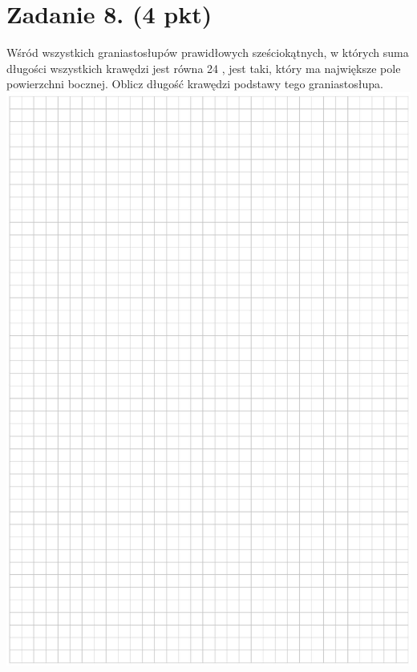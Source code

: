 \documentclass[10pt]{article}
\begin{document}
\section*{Zadanie 8. (4 pkt)}
Wśród wszystkich graniastosłupów prawidłowych sześciokątnych, w których suma długości wszystkich krawędzi jest równa 24 , jest taki, który ma największe pole powierzchni bocznej. Oblicz długość krawędzi podstawy tego graniastosłupa.\\
\includegraphics[max width=\textwidth, center]{2024_11_21_b36d8cbb94edb763da2cg-12}\\
\end{document}

